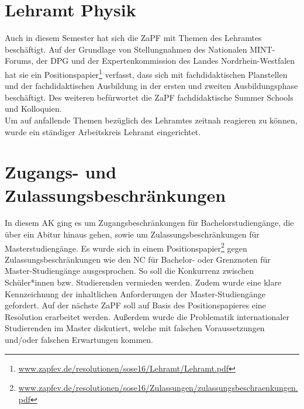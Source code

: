 \section*{Lehramt Physik}
Auch in diesem Semester hat sich die ZaPF mit Themen des Lehramtes beschäftigt. 
Auf der Grundlage von Stellungnahmen des Nationalen MINT-Forums, der DPG und 
der Expertenkommission des Landes Nordrhein-Westfalen hat sie ein 
Positionspapier\footnote{\href{http://www.zapfev.de/resolutionen/sose16/Lehramt/Lehramt.pdf}{\url{www.zapfev.de/resolutionen/sose16/Lehramt/Lehramt.pdf}}}
 verfasst, dass sich mit fachdidaktischen Planstellen und der fachdidaktischen 
Ausbildung in der ersten und zweiten Ausbildungsphase beschäftigt. Des weiteren 
befürwortet die ZaPF fachdidaktische Summer Schools und Kolloquien. \\
Um auf  anfallende Themen bezüglich des Lehramtes zeitnah reagieren zu können, wurde ein ständiger Arbeitskreis Lehramt eingerichtet. 


\section*{Zugangs- und Zulassungsbeschränkungen}
In diesem AK ging es um Zugangsbeschränkungen für Bachelorstudiengänge, 
die über ein Abitur hinaus gehen, sowie um Zulassungsbeschränkungen für 
Masterstudiengänge. Es wurde sich in einem 
Positionspapier\footnote{\href{http://www.zapfev.de/resolutionen/sose16/Zulassungen/zulassungsbeschraenkungen.pdf}{\url{www.zapfev.de/resolutionen/sose16/Zulassungen/zulassungsbeschraenkungen.pdf}}}
 gegen Zulassungsbeschränkungen wie den NC für Bachelor- oder Grenznoten für 
Master-Studiengänge ausgesprochen. So soll die Konkurrenz zwischen 
Schüler*innen bzw. Studierenden vermieden werden. Zudem wurde eine klare 
Kennzeichnung der inhaltlichen Anforderungen der Master-Studiengänge gefordert. 
Auf der nächste ZaPF soll auf Basis des Positionspapieres eine Resolution 
erarbeitet werden. Außerdem wurde die Problematik internationaler Studierenden 
im Master  diskutiert, welche mit falschen Voraussetzungen und/oder falschen 
Erwartungen kommen. \\


